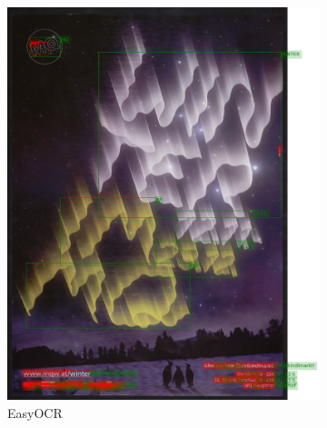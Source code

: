 \begin{figure}[hbtp!]
    \begin{subfigure}{0.5\textwidth}
        \includegraphics[scale=0.3]{obrazky/plakaty/result_easyOCR_vienna1_split_tuning_special_sensitive-73complecatedP-236873.png}
        \caption{EasyOCR}
        \label{Im4:ex:easy}
    \end{subfigure}
    \begin{subfigure}{0.45\textwidth}

\end{subfigure}
\end{figure}
